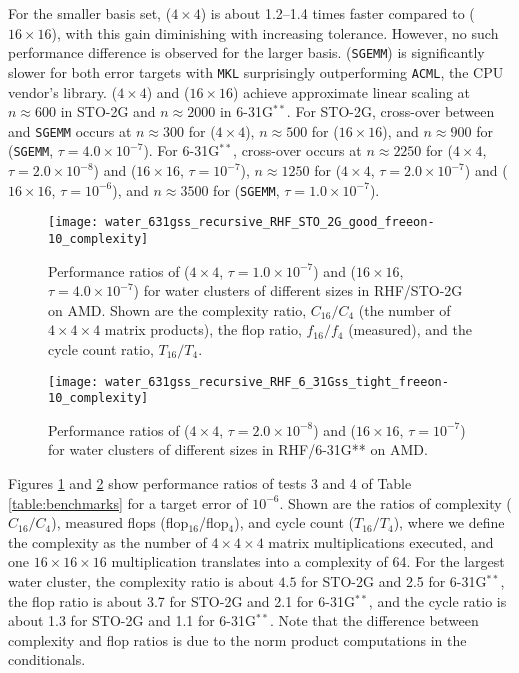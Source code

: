 For the smaller basis set, \SpAMM{}($4 \times 4$) is about 1.2--1.4 times
faster compared to \SpAMM{}($16 \times 16$), with this gain diminishing with
increasing tolerance. However, no such performance difference is observed for
the larger basis. \SpAMM{}({\tt SGEMM}) is significantly slower for both error
targets with {\tt MKL} surprisingly outperforming {\tt ACML}, the CPU vendor's
library. \SpAMM{}($4 \times 4$) and \SpAMM{}($16 \times 16$) achieve
approximate linear scaling at $n \approx 600$ in STO-2G and $n \approx 2000$ in
6-31G${}^{**}$. For STO-2G, cross-over between \SpAMM{} and {\tt SGEMM} occurs
at $n \approx 300$ for \SpAMM{}($4 \times 4$), $n \approx 500$ for
\SpAMM{}($16 \times 16$), and $n \approx 900$ for \SpAMM{}({\tt SGEMM}, $\tau
= 4.0 \times 10^{-7}$). For 6-31G${}^{**}$, cross-over occurs at $n \approx
2250$ for \SpAMM{}($4 \times 4$, $\tau = 2.0 \times 10^{-8}$) and \SpAMM{}($16
\times 16$, $\tau = 10^{-7}$), $n \approx 1250$ for \SpAMM{}($4 \times 4$,
$\tau = 2.0 \times 10^{-7}$) and \SpAMM{}($16 \times 16$, $\tau = 10^{-6}$),
and $n \approx 3500$ for \SpAMM{}({\tt SGEMM}, $\tau = 1.0 \times 10^{-7}$).

\begin{figure}
\texttt{[image: water\_631gss\_recursive\_RHF\_STO\_2G\_good\_freeon-10\_complexity]}
\caption{\label{fig:water_STO2G_AMD_complexity} Performance ratios of
\SpAMM{}($4 \times 4$, $\tau = 1.0 \times 10^{-7}$) and \SpAMM{}($16 \times
16$, $\tau = 4.0 \times 10^{-7}$) for water clusters of different sizes in
RHF/STO-2G on AMD. Shown are the complexity ratio, $C_{16}/C_{4}$ (the number
of $4 \times 4 \times 4$ matrix products), the flop ratio, $f_{16}/f_{4}$
(measured), and the cycle count ratio, $T_{16}/T_{4}$.}
\end{figure}

\begin{figure}
\texttt{[image: water\_631gss\_recursive\_RHF\_6\_31Gss\_tight\_freeon-10\_complexity]}
\caption{\label{fig:water_631gss_AMD_complexity} Performance ratios of
\SpAMM{}($4 \times 4$, $\tau = 2.0 \times 10^{-8}$) and \SpAMM{}($16 \times
16$, $\tau = 10^{-7}$) for water clusters of different sizes in RHF/6-31G** on
AMD.}
\end{figure}

Figures \ref{fig:water_STO2G_AMD_complexity} and
\ref{fig:water_631gss_AMD_complexity} show performance ratios of tests 3 and 4
of Table \ref{table:benchmarks} for a target error of $10^{-6}$. Shown are the
ratios of complexity ($C_{16}/C_{4}$), measured flops
(flop${}_{16}$/flop${}_{4}$), and cycle count ($T_{16}/T_{4}$), where we
define the complexity as the number of $4 \times 4 \times 4$ matrix
multiplications executed, and one $16 \times 16 \times 16$ multiplication
translates into a complexity of 64. For the largest water cluster, the
complexity ratio is about $4.5$ for STO-2G and 2.5 for 6-31G${}^{**}$, the
flop ratio is about 3.7 for STO-2G and 2.1 for 6-31G${}^{**}$, and the cycle
ratio is about 1.3 for STO-2G and 1.1 for 6-31G${}^{**}$. Note that the
difference between complexity and flop ratios is due to the norm product
computations in the conditionals.

